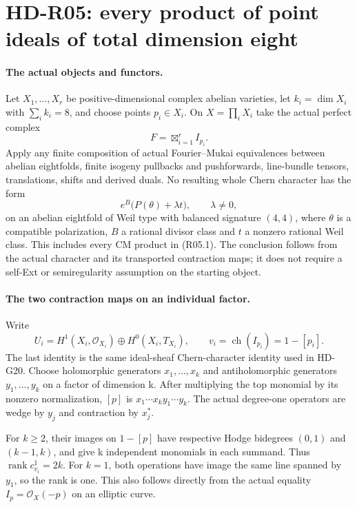 \section{HD-R05: every product of point ideals of total dimension eight}
\label{sec:point-ideal-all-products}

\paragraph{The actual objects and functors.}
Let $X_1,\ldots,X_r$ be positive-dimensional complex abelian varieties,
let $k_i=\dim X_i$ with $\sum_i k_i=8$, and choose points
$p_i\in X_i$. On $X=\prod_iX_i$ take the actual perfect complex
\[
                         F=\boxtimes_{i=1}^r I_{p_i}.
                                                               \tag{R05.1}
\]
Apply any finite composition of actual Fourier--Mukai equivalences
between abelian eightfolds, finite isogeny pullbacks and pushforwards,
line-bundle tensors, translations, shifts and derived duals. No resulting
whole Chern character has the form
\[
             e^B\bigl(P(\theta)+\lambda t\bigr),\qquad\lambda\ne0,
                                                               \tag{R05.2}
\]
on an abelian eightfold of Weil type with balanced signature $(4,4)$,
where $\theta$ is a compatible polarization, $B$ a rational divisor
class and $t$ a nonzero rational Weil class. This includes every CM
product in (R05.1). The conclusion follows from the actual character
and its transported contraction maps; it does not require a self-Ext
or semiregularity assumption on the starting object.

\paragraph{The two contraction maps on an individual factor.}
Write
\[
 U_i=H^1(X_i,\mathcal O_{X_i})\oplus H^0(X_i,T_{X_i}),
 \qquad v_i=\operatorname{ch}(I_{p_i})=1-[p_i].
\]
The last identity is the same ideal-sheaf Chern-character identity used
in HD-G20. Choose holomorphic generators $x_1,\ldots,x_k$ and
antiholomorphic generators $y_1,\ldots,y_k$ on a factor of dimension k.
After multiplying the top monomial by its nonzero normalization,
$[p]$ is $x_1\cdots x_k y_1\cdots y_k$. The actual degree-one
operators are wedge by $y_j$ and contraction by $x_j^*$.

For $k\ge2$, their images on $1-[p]$ have respective Hodge bidegrees
$(0,1)$ and $(k-1,k)$, and give k independent monomials in each
summand. Thus $\operatorname{rank}c_{v_i}^1=2k$.
For $k=1$, both operations have image the same line spanned by $y_1$,
so the rank is one. This also follows directly from the actual equality
$I_p=\mathcal O_X(-p)$ on an elliptic curve.

